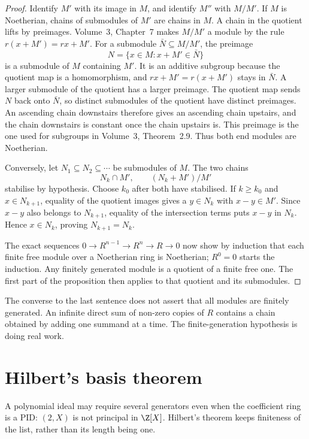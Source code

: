 \begin{proof}
Identify $M'$ with its image in $M$, and identify $M''$ with $M/M'$. If $M$ is Noetherian, chains of submodules of $M'$ are chains in $M$. A chain in the quotient lifts by preimages. Volume~3, Chapter~7 makes $M/M'$ a module by the rule $r(x+M')=rx+M'$. For a submodule $\bar N\subseteq M/M'$, the preimage
\[
N=\{x\in M:x+M'\in\bar N\}
\]
is a submodule of $M$ containing $M'$. It is an additive subgroup because the quotient map is a homomorphism, and $rx+M'=r(x+M')$ stays in $\bar N$. A larger submodule of the quotient has a larger preimage. The quotient map sends $N$ back onto $\bar N$, so distinct submodules of the quotient have distinct preimages. An ascending chain downstairs therefore gives an ascending chain upstairs, and the chain downstairs is constant once the chain upstairs is. This preimage is the one used for subgroups in Volume~3, Theorem~2.9. Thus both end modules are Noetherian.

Conversely, let $N_1\subseteq N_2\subseteq\cdots$ be submodules of $M$. The two chains
\[
N_k\cap M',\qquad (N_k+M')/M'
\]
stabilise by hypothesis. Choose $k_0$ after both have stabilised. If $k\ge k_0$ and $x\in N_{k+1}$, equality of the quotient images gives a $y\in N_k$ with $x-y\in M'$. Since $x-y$ also belongs to $N_{k+1}$, equality of the intersection terms puts $x-y$ in $N_k$. Hence $x\in N_k$, proving $N_{k+1}=N_k$.

The exact sequences $0\to R^{n-1}\to R^n\to R\to0$ now show by induction that each finite free module over a Noetherian ring is Noetherian; $R^0=0$ starts the induction. Any finitely generated module is a quotient of a finite free one. The first part of the proposition then applies to that quotient and its submodules.
\end{proof}

The converse to the last sentence does not assert that all modules are finitely generated. An infinite direct sum of non-zero copies of $R$ contains a chain obtained by adding one summand at a time. The finite-generation hypothesis is doing real work.

\section{Hilbert's basis theorem}

A polynomial ideal may require several generators even when the coefficient ring is a PID: $(2,X)$ is not principal in $\Z[X]$. Hilbert's theorem keeps finiteness of the list, rather than its length being one.

